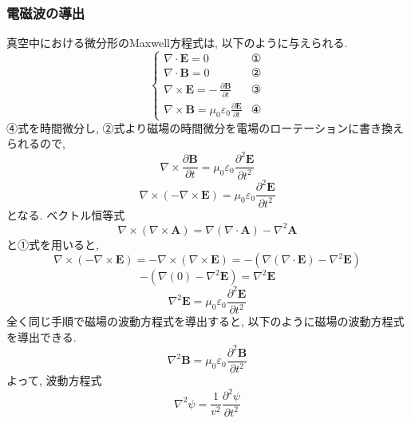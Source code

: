 \documentclass{ltjsarticle}
\begin{document}
\subsubsection{電磁波の導出}
真空中における微分形のMaxwell方程式は, 以下のように与えられる. 
\begin{equation}
  \begin{cases}
    \nabla \cdot \mathbf{E} = 0  &\text{①} \\
    \nabla \cdot \mathbf{B} = 0  &\text{②} \\
    \nabla \times \mathbf{E} = -\,\frac{\partial \mathbf{B}}{\partial t}  &\text{③} \\
    \nabla \times \mathbf{B} = \mu_0 \varepsilon_0 \frac{\partial \mathbf{E}}{\partial t} &\text{④}
  \end{cases}
\end{equation}
④式を時間微分し, ②式より磁場の時間微分を電場のローテーションに書き換えられるので, 
\begin{equation}
  \nabla  \times \frac{\partial \mathbf{B}}{\partial t} = \mu_0 \varepsilon_0 \frac{\partial^2 \mathbf{E}}{\partial t^2}
\end{equation}
\begin{equation}
  \nabla  \times ( -\nabla \times \mathbf{E} ) = \mu_0 \varepsilon_0 \frac{\partial^2 \mathbf{E}}{\partial t^2}
\end{equation}
となる. ベクトル恒等式
\begin{equation}
  \nabla \times (\nabla \times \mathbf{A}) = \nabla(\nabla \cdot \mathbf{A}) - \nabla^2 \mathbf{A}
\end{equation}
と①式を用いると,
\begin{equation}
  \nabla \times (-\nabla \times \mathbf{E}) = -\nabla \times (\nabla \times \mathbf{E}) = -(\nabla(\nabla \cdot \mathbf{E}) - \nabla^2 \mathbf{E})
\end{equation}
\begin{equation}
  -(\nabla(0) - \nabla^2 \mathbf{E}) = \nabla^2 \mathbf{E}
\end{equation}
\begin{equation}
  \nabla^2 \mathbf{E} = \mu_0 \varepsilon_0 \frac{\partial^2 \mathbf{E}}{\partial t^2}
\end{equation}
全く同じ手順で磁場の波動方程式を導出すると, 以下のように磁場の波動方程式を導出できる. 
\begin{equation}
  \nabla^2 \mathbf{B} = \mu_0 \varepsilon_0 \frac{\partial^2 \mathbf{B}}{\partial t^2}
\end{equation}
よって, 波動方程式
\begin{equation}
  \nabla^2 \psi = \frac{1}{v^2} \frac{\partial^2 \psi}{\partial t^2}
\end{equation}
\end{document}
